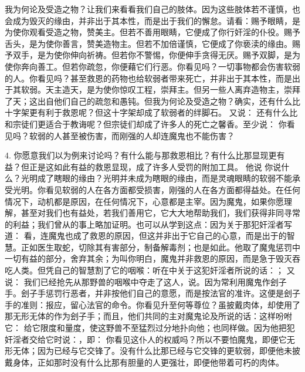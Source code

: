 我为何论及受造之物？让我们来看看我们自己的肢体。因为这些肢体若不谨慎，也会成为毁灭的缘由，并非出于其本性，而是出于我们的懈怠。请看：赐予眼睛，是为使你观看受造之物，赞美主。但若不善用眼睛，它便成了你行奸淫的仆役。赐予舌头，是为使你善言，赞美造物主。但若不加倍谨慎，它便成了你亵渎的缘由。赐予双手，是为使你伸向祈祷。但若你不警惕，你便伸手贪得无厌。赐予双脚，是为使你奔向善工。但若你疏忽，你便藉它们行恶。你看见吗？一切事物都会伤害软弱的人。你看见吗？甚至救恩的药物也给软弱者带来死亡，并非出于其本性，而是出于其软弱。天主造天，是为使你惊叹工程，崇拜主。但另一些人离弃造物主，崇拜了天；这出自他们自己的疏忽和愚钝。但我为何论及受造之物？确实，还有什么比十字架更有利于救恩呢？但这十字架却成了软弱者的绊脚石。 又说： 还有什么比和宗徒们更适合于教诲呢？但宗徒们却成了许多人的死亡之馨香。至少说： 你看见吗？软弱的人甚至被伤害，而刚强的人却连魔鬼也不能伤害？\par

4. 你愿意我们以为例来讨论吗？有什么能与那救恩相比？有什么比那显现更有益？但正是这如此有益的救恩显现，成了许多人受罚的附加工具。 他说  你说什么？光明成了瞎眼的缘由？光明并未成为瞎眼的缘由，而是灵魂眼睛的软弱不能承受光明。你看见软弱的人在各方面都受损害，刚强的人在各方面都得益处。在任何情况下，动机都是原因，在任何情况下，心意都是主宰。因为魔鬼，如果你愿理解，甚至对我们也有益处，若我们善用它，它大大地帮助我们，我们获得非同寻常的利益；我们曾从的事上略加证明。也可以从学到这点：因为关于那犯奸淫者写道： 看，连魔鬼也成了救恩的原因，但这并非出于它自己的心意，而是出于的智慧。正如医生取蛇，切除其有害部分，制备解毒剂；也是如此。他取了魔鬼惩罚中一切有益的部分，舍弃其余；为叫你明白，魔鬼并非救恩的原因，而是急于毁灭吞吃人类。但凭自己的智慧割了它的咽喉：听在中关于这犯奸淫者所说的话：； 又说： 我们已经抢先从那野兽的咽喉中夺走了这人，说。因为常利用魔鬼作刽子手。刽子手惩罚行恶者，并非按他们自己的意愿，而是按法官的准许。这便是刽子手的准则：报应，留心法官的命令。你看见升至何等尊位？虽披戴肉体，却使用了那无形无体的作为刽子手；而且，他们共同的主对魔鬼论及所说的话：这样吩咐它： 给它限度和量度，使这野兽不至猛烈过分地扑向他；也同样做。因为他把犯奸淫者交给它时说：，即： 你看见这仆人的权威吗？所以不要怕魔鬼，即便它无形无体；因为已经与它交锋了。没有什么比那已经与它交锋的更软弱，即便他未披戴身体，正如那时没有什么比那有胆量的人更强壮，即便他带着可朽的肉体。\par

